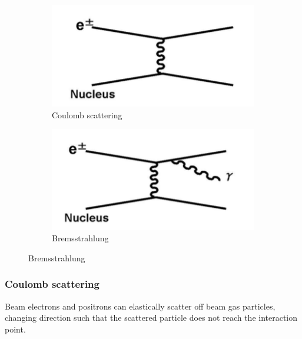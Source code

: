 \documentclass[12pt]{thesis}  %
\begin{document}
  \begin{figure}[h]
        \centering
        \begin{subfigure}[b]{0.475\textwidth}
            \centering
            \includegraphics[width=\textwidth]{images/coulomb-scattering.png}
            \caption[Network2]%
            {{\small Coulomb scattering}}    
            \label{fig:mean and std of net14}
        \end{subfigure}
        \hfill
        \begin{subfigure}[b]{0.475\textwidth}  
            \centering 
            \includegraphics[width=\textwidth]{images/bremsstrahlung.png}
            \caption[]%
            {{\small Bremsstrahlung}}    
            \label{fig:mean and std of net24}
        \end{subfigure}
    \end{figure}


\subsubsection{Coulomb scattering}

Beam electrons and positrons can elastically scatter off beam gas particles, changing direction such that the scattered particle does not reach the interaction point.
\end{document}
